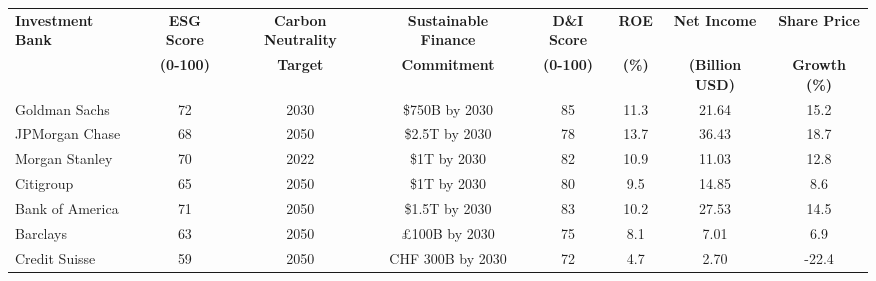 \documentclass[border=10pt]{standalone}
\begin{document}
\begin{tabular}{>{\columncolor{headercolor}\color{white}}l*{7}{>{\columncolor{headercolor}\color{white}}c}}
\toprule
\textbf{Investment Bank} & \textbf{ESG Score} & \textbf{Carbon Neutrality} & \textbf{Sustainable Finance} & \textbf{D\&I Score} & \textbf{ROE} & \textbf{Net Income} & \textbf{Share Price} \\
& \textbf{(0-100)} & \textbf{Target} & \textbf{Commitment} & \textbf{(0-100)} & \textbf{(\%)} & \textbf{(Billion USD)} & \textbf{Growth (\%)} \\
\midrule
\rowcolor{rowcolor1}
Goldman Sachs & 72 & 2030 & \$750B by 2030 & 85 & 11.3 & 21.64 & 15.2 \\
\rowcolor{rowcolor2}
JPMorgan Chase & 68 & 2050 & \$2.5T by 2030 & 78 & 13.7 & 36.43 & 18.7 \\
\rowcolor{rowcolor1}
Morgan Stanley & 70 & 2022 & \$1T by 2030 & 82 & 10.9 & 11.03 & 12.8 \\
\rowcolor{rowcolor2}
Citigroup & 65 & 2050 & \$1T by 2030 & 80 & 9.5 & 14.85 & 8.6 \\
\rowcolor{rowcolor1}
Bank of America & 71 & 2050 & \$1.5T by 2030 & 83 & 10.2 & 27.53 & 14.5 \\
\rowcolor{rowcolor2}
Barclays & 63 & 2050 & £100B by 2030 & 75 & 8.1 & 7.01 & 6.9 \\
\rowcolor{rowcolor1}
Credit Suisse & 59 & 2050 & CHF 300B by 2030 & 72 & 4.7 & 2.70 & -22.4 \\
\bottomrule
\end{tabular}
\end{document}
